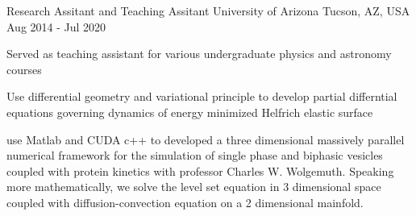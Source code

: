   \cventry
    {Research Assitant and Teaching Assitant} %
    {University of Arizona} %
    {Tucson, AZ, USA} %
    {Aug 2014 - Jul 2020} %
    {
      \begin{cvitems} %
         \item {Served as teaching assistant for various undergraduate physics and astronomy courses}
         \item {Use differential geometry and variational principle to develop partial differntial equations governing dynamics of energy minimized Helfrich elastic surface}
         \item {use Matlab and CUDA c++ to developed a three dimensional massively parallel numerical framework for the simulation of single phase and biphasic vesicles coupled with protein kinetics with professor Charles W. Wolgemuth. Speaking more mathematically, we solve the level set equation in 3 dimensional space coupled with diffusion-convection equation on a 2 dimensional mainfold.}
      \end{cvitems}
    }
  
